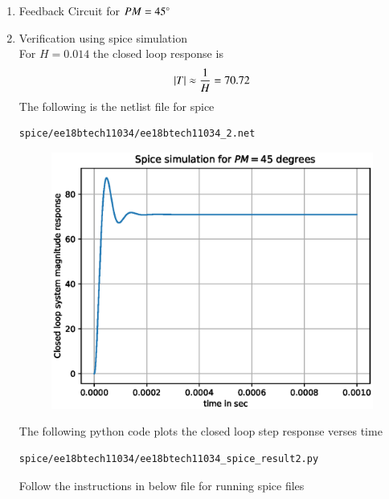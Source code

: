 \begin{enumerate}[label=\arabic*.,ref=\theenumi]
\item Feedback Circuit for $PM = 45\degree$\\
\solution
\begin{figure}[ht!]
	\begin{center}
		\resizebox{\columnwidth}{!}{}
	\end{center}
	\caption{}
	\label{fig:ee18btech11034_fige}
\end{figure}
\item Verification using spice simulation\\
\solution For $H=0.014$ the closed loop response is
\begin{align}
\left\vert T\right\vert \approx \frac{1}{H} = 70.72
\end{align}
The following is the netlist file for spice
\begin{lstlisting}
spice/ee18btech11034/ee18btech11034_2.net
\end{lstlisting}
\begin{figure}[!h]
\centering
\includegraphics[width=\columnwidth]{./figs/ee18btech11034/ee18btech11034_spice_result2.eps}
\caption{}
\label{fig:ee18btech11034_spice_result2}
\end{figure}
The following python code plots the closed loop step response verses time
\begin{lstlisting}
spice/ee18btech11034/ee18btech11034_spice_result2.py
\end{lstlisting}
Follow the instructions in below file for running spice files 
\begin{lstlisting}

\end{lstlisting}
\end{enumerate}
